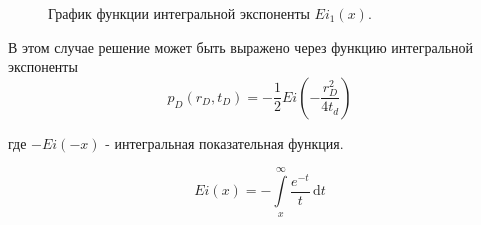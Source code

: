 \begin{figure}
	\begin{center}
		\caption{График функции интегральной экспоненты $Ei_1(x)$.}
		\label{ris:ei1}
	\end{center}
\end{figure}



В этом случае решение может быть выражено через функцию интегральной экспоненты 
$$ p_D(r_D,t_D) = - \frac{1}{2} Ei \left(- \dfrac{ r_D^2}{4t_d} \right)$$

где $-Ei(-x)$ - интегральная показательная функция.

$$Ei(x)=-\int\limits_{x}^{\infty}\frac{e^{-t}}{t}\,\mathrm dt$$


